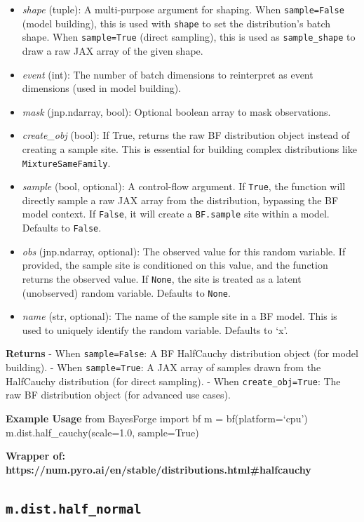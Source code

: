 \documentclass[
  letterpaper,
  DIV=11,
  numbers=noendperiod]{scrartcl}
\begin{document}
\begin{itemize}
\item
  \emph{shape} (tuple): A multi-purpose argument for shaping. When
  \texttt{sample=False} (model building), this is used with
  \texttt{shape} to set the distribution's batch shape. When
  \texttt{sample=True} (direct sampling), this is used as
  \texttt{sample\_shape} to draw a raw JAX array of the given shape.
\item
  \emph{event} (int): The number of batch dimensions to reinterpret as
  event dimensions (used in model building).
\item
  \emph{mask} (jnp.ndarray, bool): Optional boolean array to mask
  observations.
\item
  \emph{create\_obj} (bool): If True, returns the raw BF distribution
  object instead of creating a sample site. This is essential for
  building complex distributions like \texttt{MixtureSameFamily}.
\item
  \emph{sample} (bool, optional): A control-flow argument. If
  \texttt{True}, the function will directly sample a raw JAX array from
  the distribution, bypassing the BF model context. If \texttt{False},
  it will create a \texttt{BF.sample} site within a model. Defaults to
  \texttt{False}.
\item
  \emph{obs} (jnp.ndarray, optional): The observed value for this random
  variable. If provided, the sample site is conditioned on this value,
  and the function returns the observed value. If \texttt{None}, the
  site is treated as a latent (unobserved) random variable. Defaults to
  \texttt{None}.
\item
  \emph{name} (str, optional): The name of the sample site in a BF
  model. This is used to uniquely identify the random variable. Defaults
  to `x'.
\end{itemize}

\textbf{Returns} - When \texttt{sample=False}: A BF HalfCauchy
distribution object (for model building). - When \texttt{sample=True}: A
JAX array of samples drawn from the HalfCauchy distribution (for direct
sampling). - When \texttt{create\_obj=True}: The raw BF distribution
object (for advanced use cases).

\textbf{Example Usage} from BayesForge import bf m = bf(platform=`cpu')
m.dist.half\_cauchy(scale=1.0, sample=True)

\textbf{Wrapper of:
https://num.pyro.ai/en/stable/distributions.html\#halfcauchy}

\subsection{\texorpdfstring{\texttt{m.dist.half\_normal}}{m.dist.half\_normal}}\label{half_normal}
\end{document}
